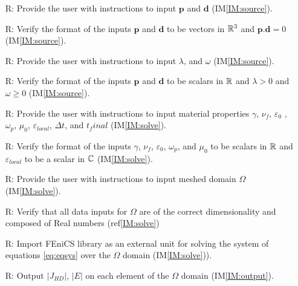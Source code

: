 \documentclass[12pt]{article}
\newcounter{reqnum} %
\begin{document}
\noindent \begin{itemize}

\item[R\refstepcounter{reqnum}\thereqnum \label{R_source}:] Provide the user with instructions to input $\textbf{p}$ and $\textbf{d}$ (IM\ref{IM:source}).

\item[R\refstepcounter{reqnum}\thereqnum \label{R_sourcecheck}:] Verify the format of the inputs $\textbf{p}$ and $\textbf{d}$ to be vectors in $\Bbb R^3$ and $\textbf{p}\textbf{.}\textbf{d}=0$ (IM\ref{IM:source}).

\item[R\refstepcounter{reqnum}\thereqnum \label{R_source}:] Provide the user with instructions to input $\lambda$, and $\omega$ (IM\ref{IM:source}).

\item[R\refstepcounter{reqnum}\thereqnum \label{R_sourcecheck}:] Verify the format of the inputs $\textbf{p}$ and $\textbf{d}$ to be scalars in $\Bbb R$ and $\lambda>0$ and $\omega \geqslant0$ (IM\ref{IM:source}).

\item[R\refstepcounter{reqnum}\thereqnum \label{R_materialprop}:] Provide the user with instructions to input material properties $\gamma$, $\nu_f$, $\varepsilon_0$ , $\omega_p$, $\mu_{0}$, $\varepsilon_{local}$, $\Delta t$, and $t_final$ (IM\ref{IM:solve}).

\item[R\refstepcounter{reqnum}\thereqnum \label{R_materialpropcheck}:] Verify the format of the inputs $\gamma$, $\nu_f$, $\varepsilon_0$, $\omega_p$, and $\mu_{0}$ to be scalars in $\Bbb R$ and $\varepsilon_{local}$ to be a scalar in $\Bbb C$ (IM\ref{IM:solve}).
 
\item[R\refstepcounter{reqnum}\thereqnum \label{R_Output}:] Provide the user with instructions to input meshed domain $\Omega$ (IM\ref{IM:solve}).

\item[R\refstepcounter{reqnum}\thereqnum \label{R_Output}:] Verify that all data inputs for $\Omega$ are of the correct dimensionality and composed of Real numbers (ref\ref{IM:solve})

\item[R\refstepcounter{reqnum}\thereqnum \label{R_FEniCS}:] Import FEniCS library as an external unit for solving the system of equations \ref{eq:eqsys} over the $\Omega$ domain (IM\ref{IM:solve})).

\item[R\refstepcounter{reqnum}\thereqnum \label{R_Output}:] Output $|J_{HD}|$, $|E|$ on each element of the $\Omega$ domain (IM\ref{IM:output}).
 

\end{itemize}
\end{document}
